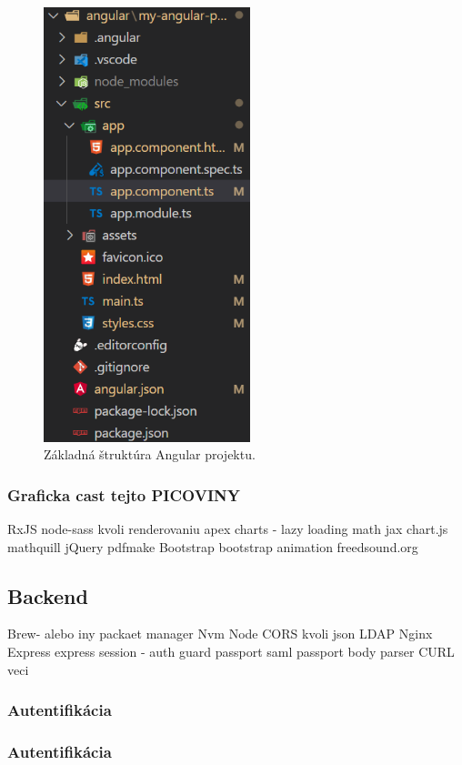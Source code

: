 \begin{figure}[H]
  \centering
  \includegraphics[width=6cm]{img/angular-structure.png}
  \caption{Základná štruktúra Angular projektu.}
  \label{fig:angular-structure}
\end{figure}

\subsubsection{Graficka cast tejto PICOVINY}
 RxJS
 node-sass kvoli renderovaniu
 apex charts - lazy loading
 math jax 
 chart.js 
 mathquill
 jQuery
 pdfmake
 Bootstrap
 bootstrap animation
 freedsound.org

\subsection{Backend}

 Brew- alebo iny packaet manager
 Nvm
 Node
 CORS kvoli json
 LDAP
 Nginx
 Express
 express session - auth guard
 passport saml
 passport
 body parser
 CURL veci
 \subsubsection{Autentifikácia}
 \subsubsection{Autentifikácia}

